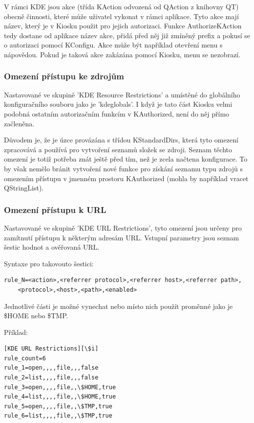 V rámci KDE jsou akce (třída KAction odvozená od QAction z knihovny QT) obecně
činnosti, které může uživatel vykonat v rámci aplikace. Tyto akce mají název,
který je v Kiosku použit pro jejich autorizaci. Funkce AuthorizeKAction tedy
dostane od aplikace název akce, přidá před něj již zmíněný prefix a pokusí se
o autorizaci pomocí KConfigu.
Akce může být například otevření menu s nápovědou. Pokud je taková akce zakázána
pomocí Kiosku, menu se nezobrazí.

\subsubsection{Omezení přístupu ke zdrojům}
Nastavované ve skupině 'KDE Resource Restrictions' a umístěné do globálního
konfiguračního souboru jako je 'kdeglobals'.
I když je tato část Kiosku velmi podobná ostatním autorizačním funkcím
v KAuthorized, není do něj přímo začleněna.

Důvodem je, že je úzce provázána s třídou KStandardDirs, která tyto omezení
zpracovává a používá pro vytvoření seznamů složek se zdroji. Seznam těchto
omezení je totiž potřeba znát ještě před tím, než je zcela načtena konfigurace.
To by však nemělo bránit vytvoření nové funkce pro získání seznamu typu zdrojů
s omezením přístupu v jmenném prostoru KAuthorized (mohla by například vracet
QStringList).

\subsubsection{Omezení přístupu k URL}
Nastavované ve skupině 'KDE URL Restrictions', tyto omezení jsou určeny
pro zamítnutí přístupu k některým adresám URL. Vstupní parametry jsou seznam
šestic hodnot a ověřovaná URL.

Syntaxe pro takovouto šestici:
\begin{verbatim}
rule_N=<action>,<referrer protocol>,<referrer host>,<referrer path>,
    <protocol>,<host>,<path>,<enabled>
\end{verbatim}

Jednotlivé části je možné vynechat nebo místo nich použít proměnné jako
je \$HOME nebo \$TMP.

Příklad:
\begin{verbatim}
[KDE URL Restrictions][\$i]
rule_count=6
rule_1=open,,,,file,,,false
rule_2=list,,,,file,,,false
rule_3=open,,,,file,,\$HOME,true
rule_4=list,,,,file,,\$HOME,true
rule_5=open,,,,file,,\$TMP,true
rule_6=list,,,,file,,\$TMP,true
\end{verbatim}

